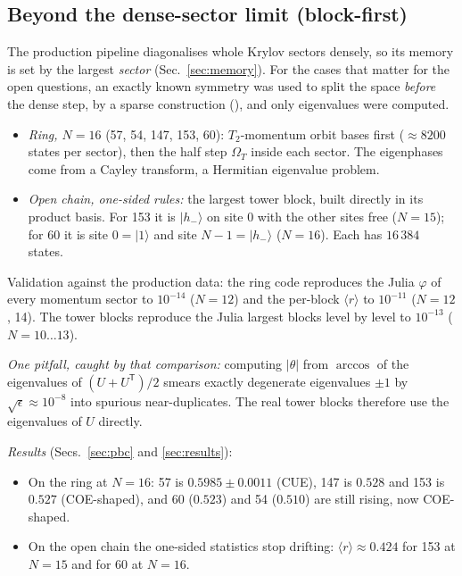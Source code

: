 \subsection{Beyond the dense-sector limit (block-first)}
The production pipeline diagonalises whole Krylov sectors densely, so its memory is set by the largest \emph{sector}
(Sec.~\ref{sec:memory}). For the cases that matter for the open questions, an exactly known symmetry was used to split
the space \emph{before} the dense step, by a sparse construction (), and only eigenvalues were
computed.
\begin{itemize}
\item \emph{Ring, $N=16$} (57, 54, 147, 153, 60): $T_2$-momentum orbit bases first ($\approx8200$ states per sector),
  then the half step $\Omega_T$ inside each sector. The eigenphases come from a Cayley transform, a Hermitian
  eigenvalue problem.
\item \emph{Open chain, one-sided rules:} the largest tower block, built directly in its product basis. For 153 it is
  $|h_-\rangle$ on site 0 with the other sites free ($N=15$); for 60 it is site $0=|1\rangle$ and site $N-1=|h_-\rangle$
  ($N=16$). Each has $16\,384$ states.
\end{itemize}
Validation against the production data: the ring code reproduces the Julia $\varphi$ of every momentum sector to
$10^{-14}$ ($N=12$) and the per-block $\langle r\rangle$ to $10^{-11}$ ($N=12$, 14). The tower blocks reproduce the
Julia largest blocks level by level to $10^{-13}$ ($N=10\ldots13$).

\emph{One pitfall, caught by that comparison:} computing $|\theta|$ from $\arccos$ of the eigenvalues of
$(U+U^{\mathsf T})/2$ smears exactly degenerate eigenvalues $\pm1$ by $\sqrt{\epsilon}\approx10^{-8}$ into spurious
near-duplicates. The real tower blocks therefore use the eigenvalues of $U$ directly.

\emph{Results} (Secs.~\ref{sec:pbc} and \ref{sec:results}):
\begin{itemize}
\item On the ring at $N=16$: 57 is $0.5985\pm0.0011$ (CUE), 147 is $0.528$ and 153 is $0.527$ (COE-shaped), and 60
  ($0.523$) and 54 ($0.510$) are still rising, now COE-shaped.
\item On the open chain the one-sided statistics stop drifting: $\langle r\rangle\approx0.424$ for 153 at $N=15$ and for
  60 at $N=16$.
\end{itemize}

